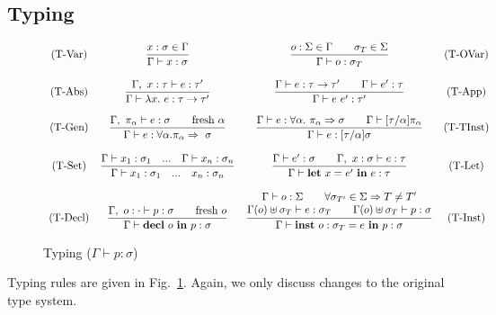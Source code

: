 \documentclass[runningheads]{llncs}
\begin{document}
\subsection{Typing}
\begin{figure}$$
  \begin{array}{c c c c} 
    \text{(T-Var)}
    &
    \displaystyle
    \frac{x: \sigma  \in \Gamma}
         {\Gamma \vdash x: \sigma }
    &
    \displaystyle
    \frac{o: \Sigma  \in \Gamma \quad \quad \sigma_T \in \Sigma}
    {\Gamma \vdash o: \sigma_T }
    &
    \text{(T-OVar)}
    \\\\
    \text{(T-Abs)}
    &
    \displaystyle
    \frac{\Gamma,\ x:\tau \vdash e : \tau^\prime}
         {\Gamma \vdash \lambda x. \ e : \tau \rightarrow \tau^\prime}
    &
    
    \displaystyle
    \frac{\Gamma \vdash e : \tau \rightarrow \tau^\prime \quad\quad \Gamma \vdash e^\prime : \tau}
         {\Gamma \vdash e \ e^\prime : \tau^\prime}
    &
    \text{(T-App)}
    \\\\
    \text{(T-Gen)}
    &
    \displaystyle
    \frac{\Gamma, \ \pi_\alpha\vdash e:\sigma \quad \quad \text{fresh }\alpha}
         {\Gamma \vdash e : \forall \alpha. \pi_\alpha \Rightarrow \ \sigma}
    &
    \displaystyle
    \frac{\Gamma \vdash e: \forall \alpha. \ \pi_\alpha \Rightarrow \sigma \quad \quad \Gamma \vdash [\tau/\alpha]\pi_\alpha}
         {\Gamma \vdash e:[\tau/\alpha]\sigma}
    &
    \text{(T-TInst)}
    \\\\
    \text{(T-Set)}
    &
    \displaystyle
    \frac{\Gamma \vdash x_1:\sigma_1  \quad ...\quad \Gamma \vdash x_n:\sigma_n}
         {\Gamma \vdash x_1:\sigma_1 \quad ...\quad x_n:\sigma_n}
    &
    \displaystyle
    \frac{\Gamma \vdash e^\prime : \sigma \quad \quad \Gamma,\ x:\sigma \vdash e : \tau}
         {\Gamma \vdash \textbf{let} \ x = e^\prime \ \textbf{in} \ e : \tau}
    &
    \text{(T-Let)}
    \\\\
    \text{(T-Decl)}
    &
    \displaystyle
    \frac{\Gamma, \ o: \cdot  \vdash p : \sigma \quad\quad \text{fresh} \ o}
         {\Gamma \vdash \textbf{decl} \ o \ \textbf{in} \ p : \sigma}
    &
    \displaystyle
    \frac{ \begin{matrix}
        \Gamma \vdash o : \Sigma \quad \quad  \forall \sigma_{T^\prime} \in \Sigma \Rightarrow T \neq T^\prime \\
        \Gamma(o) \uplus \sigma_T
        \vdash e : \sigma_T \quad \quad  \Gamma(o) \uplus \sigma_T \vdash p: \sigma
    \end{matrix}}
    {\Gamma \vdash \textbf{inst} \ o :  \sigma_T  = e \ \textbf{in} \ p : \sigma} 
    &
    \text{(T-Inst)}
  \end{array}$$
  \caption{Typing ($\Gamma \vdash p : \sigma$)} \label{typing}
\end{figure}
\noindent Typing rules are given in Fig.~\ref{typing}. Again, we only discuss changes to the original type system. 
\end{document}
